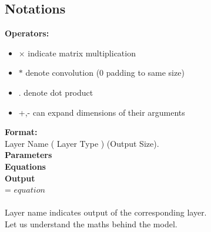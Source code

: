 \documentclass[11pt,english]{article}
\begin{document}
\subsection{Notations}
\textbf{Operators:}
\begin{itemize}
    \item $\times$ indicate matrix multiplication
    \item $*$ denote convolution (0 padding to same size)
    \item . denote dot product
    \item +,- can expand dimensions of their arguments
\end{itemize}
\vspace{0.25em}
\textbf{Format:}\\ 
Layer Name ( Layer Type ) (Output Size). \\
\textbf{Parameters}\\
\textbf{Equations}\\
\textbf{Output}\\
= $equation$\\
\\
Layer name indicates output of the corresponding layer.\\
Let us understand the maths behind the model.
\end{document}
